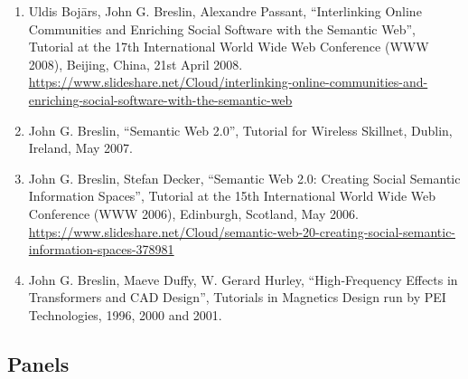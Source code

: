 \documentclass[10pt,a4paper]{res} %
\begin{document}
\begin{resume}
\begin{enumerate}
\item Uldis Boj\={a}rs, John G. Breslin, Alexandre Passant, ``Interlinking Online Communities and Enriching Social Software with the Semantic Web'', Tutorial at the 17th International World Wide Web Conference (WWW 2008), Beijing, China, 21st April 2008. \url{https://www.slideshare.net/Cloud/interlinking-online-communities-and-enriching-social-software-with-the-semantic-web}
\item John G. Breslin, ``Semantic Web 2.0'', Tutorial for Wireless Skillnet, Dublin, Ireland, May 2007. %
\item John G. Breslin, Stefan Decker, ``Semantic Web 2.0: Creating Social Semantic Information Spaces'', Tutorial at the 15th International World Wide Web Conference (WWW 2006), Edinburgh, Scotland, May 2006. \url{https://www.slideshare.net/Cloud/semantic-web-20-creating-social-semantic-information-spaces-378981}
\item John G. Breslin, Maeve Duffy, W. Gerard Hurley, ``High-Frequency Effects in Transformers and CAD Design'', Tutorials in Magnetics Design run by PEI Technologies, 1996, 2000 and 2001. %
\end{enumerate}

\subsection*{Panels}


\end{resume}
\end{document}

